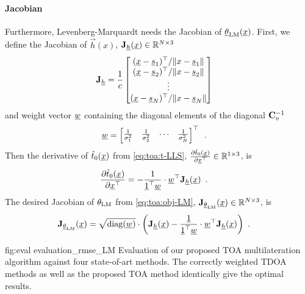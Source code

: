 \documentclass[conference]{IEEEtran}
\begin{document}
\paragraph*{Jacobian}
Furthermore, Levenberg-Marquardt needs the Jacobian of $\vec \theta_{\op{LM}}(\x)$. 
%
%
First, we define the Jacobian of $\vec h(x)$, ${\mathbf J}_{\underline{h}}({\underline{x}}) \in \mathbb{R}^{N \times 3}$
\begin{align}
    {\mathbf J}_{\underline{h}} &= \frac{1}{c} \begin{bmatrix}
        \mathopen{}\left( {\underline{x}}-{\underline{s}}_1 \right)\mathclose{}^\top/{\mathopen{}\left\| x-{\underline{s}}_1 \right\|\mathclose{}} \\ 
        \mathopen{}\left( {\underline{x}}-{\underline{s}}_2 \right)\mathclose{}^\top/{\mathopen{}\left\| x-{\underline{s}}_2 \right\|\mathclose{}} \\ 
        \vdots \\ 
        \mathopen{}\left( {\underline{x}}-{\underline{s}}_N \right)\mathclose{}^\top/{\mathopen{}\left\| x-{\underline{s}}_N \right\|\mathclose{}} 
    \end{bmatrix} 
\end{align}
and weight vector ${\underline{w}}$ containing the diagonal elements of the diagonal ${\mathbf C}_v^{-1}$
\begin{align}
    {\underline{w}} &= \begin{bmatrix}
        \frac{1}{\sigma_1^2} & \frac{1}{\sigma_2^2} & \cdots & \frac{1}{\sigma_N^2} 
    \end{bmatrix}^\top \enspace. 
\end{align}
%
%
Then the derivative of $\hat t_0({\underline{x}})$ from \cref{eq:toa:t-LLS}, $\frac{\partial \hat t_0({\underline{x}})}{\partial {\underline{x}}^\top} \in \mathbb{R}^{1 \times 3}$, is 
\begin{align}
    \frac{\partial \hat t_0({\underline{x}})}{\partial {\underline{x}}^\top} &= - \frac{1}{\underline{1}^\top \underline{w}} \cdot {\underline{w}}^\top {\mathbf J}_{\underline{h}}({\underline{x}}) \enspace.  
\end{align}
The desired Jacobian of $\theta_{\op{LM}}$ from \cref{eq:toa:obj-LM}, $\mat J_{\vec \theta_{\op{LM}}}(\x) \in \NewR^{N \times 3}$, is 
\begin{align}
    \mat J_{\vec \theta_{\op{LM}}}(\x) &= \sqrt{\diag(\w)} \cdot \paren{ \mat J_{\vec h}(\x) - \frac{\vec 1}{\vec 1\T \vec w} \cdot \w\T \mat J_{\vec h}(\x) } \enspace.  
\end{align}



 {fig:eval} {evaluation_rmse_LM} {Evaluation of our proposed \ac{TOA} multilateration algorithm against four state-of-art methods. The correctly weighted \ac{TDOA} methods as well as the proposed \ac{TOA} method identically give the optimal results. }
\end{document}
